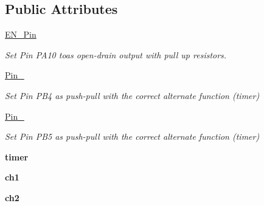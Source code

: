 \subsection*{Public Attributes}
\begin{DoxyCompactItemize}
\item 
\hyperlink{classmotor_1_1MotorDriver_a8f89863faa5971f7ecd3f238e7fc6a7a}{E\+N\+\_\+\+Pin}\hypertarget{classmotor_1_1MotorDriver_a8f89863faa5971f7ecd3f238e7fc6a7a}{}\label{classmotor_1_1MotorDriver_a8f89863faa5971f7ecd3f238e7fc6a7a}

\begin{DoxyCompactList}\small\item\em Set Pin P\+A10 toas open-\/drain output with pull up resistors. \end{DoxyCompactList}\item 
\hyperlink{classmotor_1_1MotorDriver_aca14e26826187d9f97008c2a4d94e3a7}{Pin\+\_}\hypertarget{classmotor_1_1MotorDriver_aca14e26826187d9f97008c2a4d94e3a7}{}\label{classmotor_1_1MotorDriver_aca14e26826187d9f97008c2a4d94e3a7}

\begin{DoxyCompactList}\small\item\em Set Pin P\+B4 as push-\/pull with the correct alternate function (timer) \end{DoxyCompactList}\item 
\hyperlink{classmotor_1_1MotorDriver_a37941f357ab92aec7a783847c6d60e99}{Pin\+\_}\hypertarget{classmotor_1_1MotorDriver_a37941f357ab92aec7a783847c6d60e99}{}\label{classmotor_1_1MotorDriver_a37941f357ab92aec7a783847c6d60e99}

\begin{DoxyCompactList}\small\item\em Set Pin P\+B5 as push-\/pull with the correct alternate function (timer) \end{DoxyCompactList}\item 
{\bfseries timer}\hypertarget{classmotor_1_1MotorDriver_a41b9136956046016568e7d9f1c957e4f}{}\label{classmotor_1_1MotorDriver_a41b9136956046016568e7d9f1c957e4f}

\item 
{\bfseries ch1}\hypertarget{classmotor_1_1MotorDriver_ab59ff180f9593d716a60d0177cd8564e}{}\label{classmotor_1_1MotorDriver_ab59ff180f9593d716a60d0177cd8564e}

\item 
{\bfseries ch2}\hypertarget{classmotor_1_1MotorDriver_af47581f527f4163d62810c617e081001}{}\label{classmotor_1_1MotorDriver_af47581f527f4163d62810c617e081001}

\end{DoxyCompactItemize}


